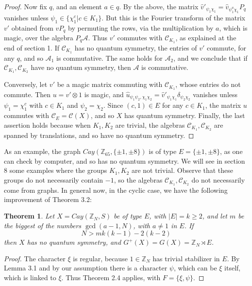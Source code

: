 \documentclass[11pt]{amsart}
\newtheorem{theorem}{Theorem}[section]
\newcommand{\A}{\mathcal A}
\newcommand{\C}{\mathcal C}
\newcommand{\Z}{\mathbb Z}
\newcommand{\hu}{\widehat u}
\begin{document}
\begin{proof}
Now fix $q$, and an element $a\in q$. By the above, the matrix $\widehat{v}'_{\psi_1\chi_1}=\widehat{v}_{\psi_1^a\chi_1}P_q$ vanishes unless $\psi_1\in\{\chi_1^c|c\in K_1\}$. But this is the Fourier transform of the matrix $v'$ obtained from $vP_q$ by permuting the rows, via the multiplication by $a$, which is magic, over the algebra $P_q\A$. Thus $v'$ commutes with $\C_{K_1}$, as explained at the end of section 1. If $\C_{K_1}$ has no quantum symmetry, the entries of $v'$ commute, for any $q$, and so $\A_1$ is commutative. The same holds for $\A_2$, and we conclude that if $\C_{K_1},\C_{K_2}$ have no quantum symmetry, then $\A$ is commutative.

Conversely, let $v'$ be a magic matrix commuting with $\C_{K_1}$, whose entries do not commute. Then $u=v'\otimes1$ is magic, and $\hu_{\psi_1\psi_2,\chi_1\chi_2}=\widehat{v}'_{\psi_1\chi_1}\delta_{\psi_2\chi_2}$ vanishes unless $\psi_1=\chi_1^c$ with $c\in K_1$ and $\psi_2=\chi_2$. Since $(c,1)\in E$ for any $c\in K_1$, the matrix $u$ commutes with $\C_E=\C(X)$, and so $X$ has quantum symmetry. Finally, the last assertion holds because when $K_1,K_2$ are trivial, the algebras $\C_{K_1},\C_{K_2}$ are spanned by translations, and so have no quantum symmetry.
\end{proof}

As an example, the graph $Cay(\Z_{65},\{\pm1,\pm8\})$ is of type $E=\{\pm1,\pm8\}$, as one can check by computer, and so has no quantum symmetry. We will see in section 8 some examples where the groups $K_1,K_2$ are not trivial. Observe that these groups do not necessarily contain $-1$, so the algebras $\C_{K_1},\C_{K_2}$ do not necessarily come from graphs. In general now, in the cyclic case, we have the following improvement of Theorem 3.2:

\begin{theorem}
Let $X=Cay(\Z_N,S)$ be of type $E$, with $|E|=k\geq2$, and let $m$ be the biggest of the numbers $\gcd(a-1,N)$, with $a\neq1$ in $E$. If
$$N>mk(k-1)-2(k-2)$$
then $X$ has no quantum symmetry, and $G^+(X)=G(X)=\Z_N\rtimes E$.
\end{theorem}

\begin{proof}
The character $\xi$ is regular, because $1\in\Z_N$ has trivial stabilizer in $E$. By Lemma 3.1 and by our assumption there is a character $\psi$, which can be $\xi$ itself, which is linked to $\xi$. Thus Theorem 2.4 applies, with $F=\{\xi,\psi\}$.
\end{proof}
\end{document}
